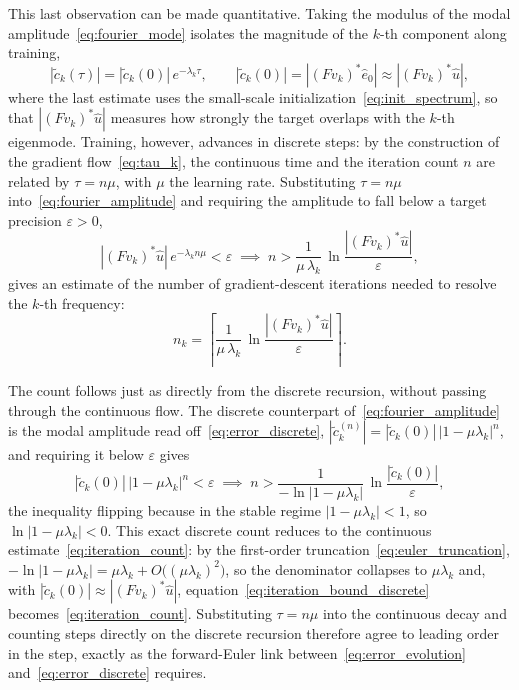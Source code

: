 This last observation can be made quantitative. Taking the modulus of the modal amplitude~\eqref{eq:fourier_mode} isolates the magnitude of the $k$-th component along training,
\begin{equation}\label{eq:fourier_amplitude}
    |\tilde c_k(\tau)| = |\tilde c_k(0)|\,e^{-\lambda_k\tau},
    \qquad
    |\tilde c_k(0)| = |(F v_k)^{*}\hat e_0| \approx |(F v_k)^{*}\hat u|,
\end{equation}
where the last estimate uses the small-scale initialization~\eqref{eq:init_spectrum}, so that $|(F v_k)^{*}\hat u|$ measures how strongly the target overlaps with the $k$-th eigenmode. Training, however, advances in discrete steps: by the construction of the gradient flow~\eqref{eq:tau_k}, the continuous time and the iteration count $n$ are related by $\tau = n\mu$, with $\mu$ the learning rate. Substituting $\tau = n\mu$ into~\eqref{eq:fourier_amplitude} and requiring the amplitude to fall below a target precision $\varepsilon > 0$,
\begin{equation*}
    |(F v_k)^{*}\hat u|\,e^{-\lambda_k n\mu} < \varepsilon
    \;\implies\;
    n > \frac{1}{\mu\,\lambda_k}\,\ln\frac{|(F v_k)^{*}\hat u|}{\varepsilon},
\end{equation*}
gives an estimate of the number of gradient-descent iterations needed to resolve the $k$-th frequency:
\begin{equation}\label{eq:iteration_count}
    n_k = \left\lceil \frac{1}{\mu\,\lambda_k}\,\ln\frac{|(F v_k)^{*}\hat u|}{\varepsilon}\right\rceil.
\end{equation}

The count follows just as directly from the discrete recursion, without passing through the continuous flow. The discrete counterpart of~\eqref{eq:fourier_amplitude} is the modal amplitude read off~\eqref{eq:error_discrete}, $|\tilde c_k^{(n)}| = |\tilde c_k(0)|\,|1 - \mu\lambda_k|^n$, and requiring it below $\varepsilon$ gives
\begin{equation}\label{eq:iteration_bound_discrete}
    |\tilde c_k(0)|\,|1 - \mu\lambda_k|^n < \varepsilon
    \;\implies\;
    n > \frac{1}{-\ln|1 - \mu\lambda_k|}\,\ln\frac{|\tilde c_k(0)|}{\varepsilon},
\end{equation}
the inequality flipping because in the stable regime $|1 - \mu\lambda_k| < 1$, so $\ln|1 - \mu\lambda_k| < 0$. This exact discrete count reduces to the continuous estimate~\eqref{eq:iteration_count}: by the first-order truncation~\eqref{eq:euler_truncation}, $-\ln|1 - \mu\lambda_k| = \mu\lambda_k + O\bigl((\mu\lambda_k)^2\bigr)$, so the denominator collapses to $\mu\lambda_k$ and, with $|\tilde c_k(0)| \approx |(F v_k)^{*}\hat u|$, equation~\eqref{eq:iteration_bound_discrete} becomes~\eqref{eq:iteration_count}. Substituting $\tau = n\mu$ into the continuous decay and counting steps directly on the discrete recursion therefore agree to leading order in the step, exactly as the forward-Euler link between~\eqref{eq:error_evolution} and~\eqref{eq:error_discrete} requires.

